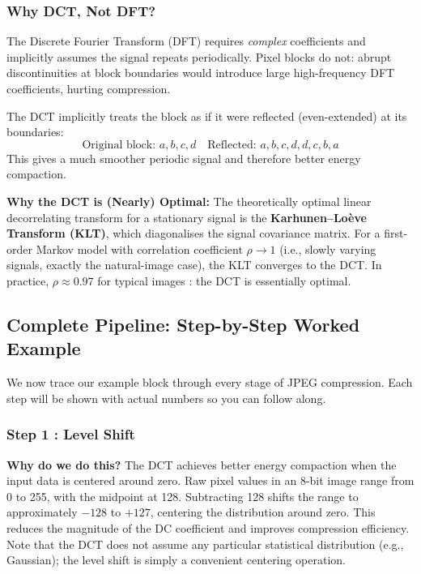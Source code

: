 \subsubsection{Why DCT, Not DFT?}

The Discrete Fourier Transform (DFT) requires \emph{complex} coefficients and implicitly assumes the signal repeats periodically. Pixel blocks do not: abrupt discontinuities at block boundaries would introduce large high-frequency DFT coefficients, hurting compression.

The DCT implicitly treats the block as if it were reflected (even-extended) at its boundaries:
\[
\text{Original block: } a, b, c, d \quad \text{Reflected: } a, b, c, d, d, c, b, a
\]
This gives a much smoother periodic signal and therefore better energy compaction.

\begin{definitionbox}
\textbf{Why the DCT is (Nearly) Optimal:} The theoretically optimal linear decorrelating transform for a stationary signal is the \textbf{Karhunen--Lo\`eve Transform (KLT)}, which diagonalises the signal covariance matrix. For a first-order Markov model with correlation coefficient $\rho\to1$ (i.e., slowly varying signals, exactly the natural-image case), the KLT converges to the DCT. In practice, $\rho\approx0.97$ for typical images : the DCT is essentially optimal.
\end{definitionbox}

\subsection{Complete Pipeline: Step-by-Step Worked Example}

We now trace our example block through every stage of JPEG compression. Each step will be shown with actual numbers so you can follow along.

\subsubsection{Step 1 : Level Shift}

\textbf{Why do we do this?} The DCT achieves better energy compaction when
the input data is centered around zero. Raw pixel values in an 8-bit image
range from 0 to 255, with the midpoint at 128. Subtracting 128 shifts the
range to approximately $-128$ to $+127$, centering the distribution around zero.
This reduces the magnitude of the DC coefficient and improves compression
efficiency. Note that the DCT does not assume any particular statistical
distribution (e.g., Gaussian); the level shift is simply a convenient
centering operation.

